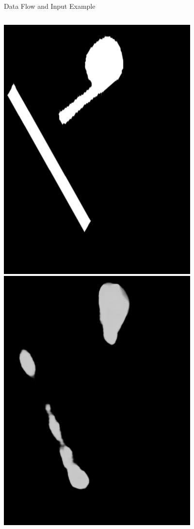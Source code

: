 \documentclass{beamer}
\begin{document}
\begin{frame}{Data Flow and Input Example}
\begin{columns}
\includegraphics[width=0.95\linewidth]{target_0.png}
\includegraphics[width=0.95\linewidth]{pred_0.png}

\end{columns}
\end{frame}
\end{document}
